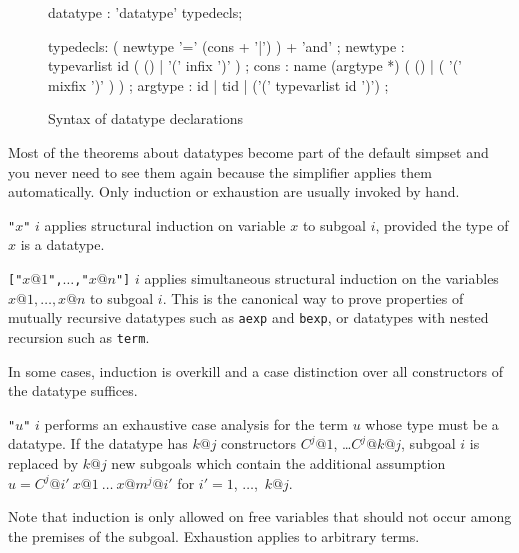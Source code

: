 \begin{figure}
\begin{rail}
datatype : 'datatype' typedecls;

typedecls: ( newtype '=' (cons + '|') ) + 'and'
         ;
newtype  : typevarlist id ( () | '(' infix ')' )
         ;
cons     : name (argtype *) ( () | ( '(' mixfix ')' ) )
         ;
argtype  : id | tid | ('(' typevarlist id ')')
         ;
\end{rail}
\caption{Syntax of datatype declarations}
\label{datatype-grammar}
\end{figure}

Most of the theorems about datatypes become part of the default simpset and
you never need to see them again because the simplifier applies them
automatically.  Only induction or exhaustion are usually invoked by hand.
\begin{ttdescription}
\item[\ttindexbold{induct_tac} {\tt"}$x${\tt"} $i$]
 applies structural induction on variable $x$ to subgoal $i$, provided the
 type of $x$ is a datatype.
\item[\ttindexbold{mutual_induct_tac}
  {\tt["}$x@1${\tt",}$\ldots${\tt,"}$x@n${\tt"]} $i$] applies simultaneous
  structural induction on the variables $x@1,\ldots,x@n$ to subgoal $i$.  This
  is the canonical way to prove properties of mutually recursive datatypes
  such as \texttt{aexp} and \texttt{bexp}, or datatypes with nested recursion such as
  \texttt{term}.
\end{ttdescription}
In some cases, induction is overkill and a case distinction over all
constructors of the datatype suffices.
\begin{ttdescription}
\item[\ttindexbold{exhaust_tac} {\tt"}$u${\tt"} $i$]
 performs an exhaustive case analysis for the term $u$ whose type
 must be a datatype.  If the datatype has $k@j$ constructors
 $C^j@1$, \dots $C^j@{k@j}$, subgoal $i$ is replaced by $k@j$ new subgoals which
 contain the additional assumption $u = C^j@{i'}~x@1~\dots~x@{m^j@{i'}}$ for
 $i'=1$, $\dots$,~$k@j$.
\end{ttdescription}

Note that induction is only allowed on free variables that should not occur
among the premises of the subgoal.  Exhaustion applies to arbitrary terms.

\bigskip


